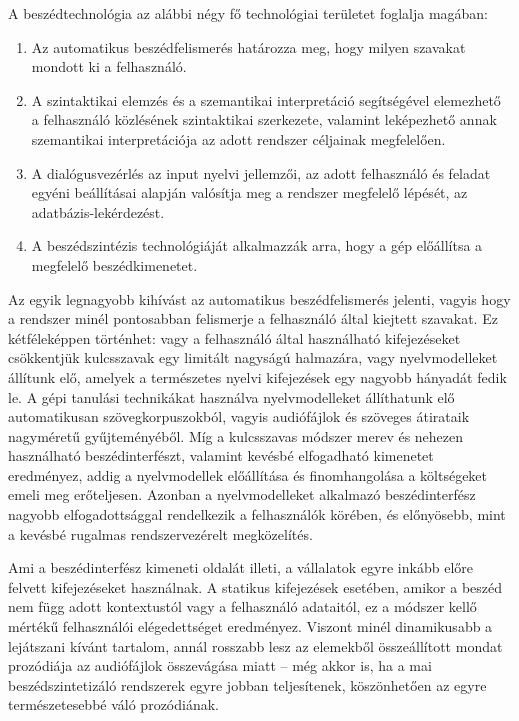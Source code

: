 \begin{multicols}{2}
\columnbreak
A beszédtechnológia az alábbi négy fő technológiai területet foglalja magában:

\begin{enumerate}
      \item Az automatikus beszédfelismerés határozza meg, hogy milyen szavakat mondott ki a felhasználó.
      \item A szintaktikai elemzés és a szemantikai interpretáció segítségével ele\-mez\-he\-tő a felhasználó közlésének szintaktikai szerkezete, valamint leképezhető annak szemantikai interpretációja az adott rendszer céljainak megfelelően. 
      \item A dialógusvezérlés az input nyelvi jellemzői, az adott felhasználó és feladat egyéni beállításai alapján valósítja meg a rendszer megfelelő lépését, az adatbázis-lekérdezést.     
      \item A beszédszintézis technológiáját alkalmazzák arra, hogy a gép előállítsa a megfelelő beszédkimenetet. 
\end{enumerate}


Az egyik legnagyobb kihívást az automatikus beszédfelismerés jelenti, vagyis hogy a rendszer minél pontosabban felismerje a felhasználó által kiejtett szavakat. Ez kétféleképpen történhet: vagy a felhasználó által használható kifejezéseket csökkentjük kulcsszavak egy limitált nagy\-sá\-gú halmazára, vagy nyelvmodelleket állítunk elő, amelyek a természetes nyelvi kifejezések egy nagyobb hányadát fedik le. A gépi tanulási technikákat használva nyelvmodelleket állíthatunk elő auto\-ma\-ti\-ku\-san szövegkorpuszokból, vagyis audiófájlok és szöveges átirataik nagyméretű gyűjteményéből. Míg a kulcsszavas módszer merev és nehezen használható beszédinterfészt, valamint kevésbé elfogadható kimenetet eredményez, addig a nyelv\-mo\-del\-lek előállítása és finomhangolása a költségeket emeli meg erőteljesen. Azonban a nyelvmodelleket alkalmazó beszédinterfész nagyobb elfogadottsággal rendelkezik a felhasználók körében, és előnyösebb, mint a kevésbé rugalmas rendszervezérelt megközelítés. 

Ami a beszédinterfész kimeneti oldalát illeti, a vállalatok egyre inkább előre felvett kifejezéseket használnak. A statikus kifejezések esetében, amikor a beszéd nem függ adott kontextustól vagy a felhasználó adataitól, ez a módszer kellő mértékű felhasználói elégedettséget eredményez. Viszont minél dinamikusabb a lejátszani kívánt tartalom, annál rosszabb lesz az ele\-mek\-ből összeállított mondat prozódiája az audiófájlok összevágása miatt -- még akkor is, ha a mai beszédszintetizáló rendszerek egyre jobban teljesítenek, köszönhetően az egyre természetesebbé váló prozódiának. 


\end{multicols}
